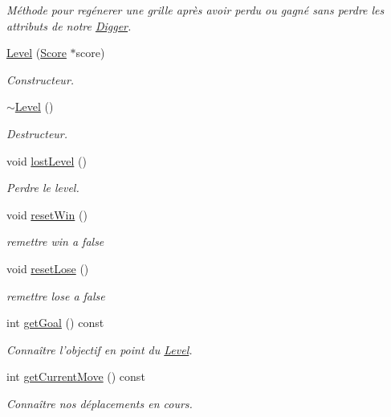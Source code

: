 \begin{DoxyCompactItemize}
\begin{DoxyCompactList}\small\item\em Méthode pour regénerer une grille après avoir perdu ou gagné sans perdre les attributs de notre \hyperlink{class_digger}{Digger}. \end{DoxyCompactList}\item 
\hyperlink{class_level_a40ebd1dfbcdd2ed15b7f9dfb98151df4}{Level} (\hyperlink{class_score}{Score} $\ast$score)
\begin{DoxyCompactList}\small\item\em Constructeur. \end{DoxyCompactList}\item 
\hyperlink{class_level_a249eac1e8f19ff44134efa5e986feaca}{$\sim$\-Level} ()
\begin{DoxyCompactList}\small\item\em Destructeur. \end{DoxyCompactList}\item 
void \hyperlink{class_level_a9291559602f5fb2cad18728b98a5f3fb}{lost\-Level} ()
\begin{DoxyCompactList}\small\item\em Perdre le level. \end{DoxyCompactList}\item 
void \hyperlink{class_level_a534a7bc704bb07bd9141fa9f6a869e50}{reset\-Win} ()
\begin{DoxyCompactList}\small\item\em remettre win a false \end{DoxyCompactList}\item 
void \hyperlink{class_level_ad56c1bf009f384ba4e721ff3d1691856}{reset\-Lose} ()
\begin{DoxyCompactList}\small\item\em remettre lose a false \end{DoxyCompactList}\item 
int \hyperlink{class_level_afa4a755701365c8f7e8f9e19286c8478}{get\-Goal} () const 
\begin{DoxyCompactList}\small\item\em Connaître l'objectif en point du \hyperlink{class_level}{Level}. \end{DoxyCompactList}\item 
int \hyperlink{class_level_ac3ae10185fc3529283360e8e038525d7}{get\-Current\-Move} () const 
\begin{DoxyCompactList}\small\item\em Connaître nos déplacements en cours. \end{DoxyCompactList}\item 

\end{DoxyCompactItemize}
